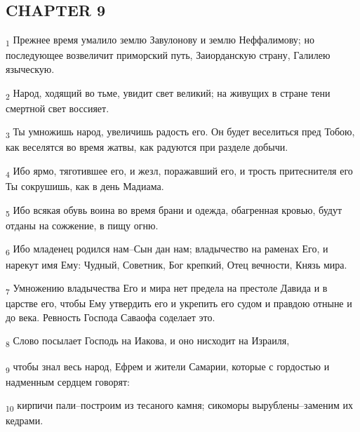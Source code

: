 \subsection{CHAPTER 9}
\begin{tcolorbox}
\textsubscript{1} Прежнее время умалило землю Завулонову и землю Неффалимову; но последующее возвеличит приморский путь, Заиорданскую страну, Галилею языческую.
\end{tcolorbox}
\begin{tcolorbox}
\textsubscript{2} Народ, ходящий во тьме, увидит свет великий; на живущих в стране тени смертной свет воссияет.
\end{tcolorbox}
\begin{tcolorbox}
\textsubscript{3} Ты умножишь народ, увеличишь радость его. Он будет веселиться пред Тобою, как веселятся во время жатвы, как радуются при разделе добычи.
\end{tcolorbox}
\begin{tcolorbox}
\textsubscript{4} Ибо ярмо, тяготившее его, и жезл, поражавший его, и трость притеснителя его Ты сокрушишь, как в день Мадиама.
\end{tcolorbox}
\begin{tcolorbox}
\textsubscript{5} Ибо всякая обувь воина во время брани и одежда, обагренная кровью, будут отданы на сожжение, в пищу огню.
\end{tcolorbox}
\begin{tcolorbox}
\textsubscript{6} Ибо младенец родился нам--Сын дан нам; владычество на раменах Его, и нарекут имя Ему: Чудный, Советник, Бог крепкий, Отец вечности, Князь мира.
\end{tcolorbox}
\begin{tcolorbox}
\textsubscript{7} Умножению владычества Его и мира нет предела на престоле Давида и в царстве его, чтобы Ему утвердить его и укрепить его судом и правдою отныне и до века. Ревность Господа Саваофа соделает это.
\end{tcolorbox}
\begin{tcolorbox}
\textsubscript{8} Слово посылает Господь на Иакова, и оно нисходит на Израиля,
\end{tcolorbox}
\begin{tcolorbox}
\textsubscript{9} чтобы знал весь народ, Ефрем и жители Самарии, которые с гордостью и надменным сердцем говорят:
\end{tcolorbox}
\begin{tcolorbox}
\textsubscript{10} кирпичи пали--построим из тесаного камня; сикоморы вырублены--заменим их кедрами.
\end{tcolorbox}
